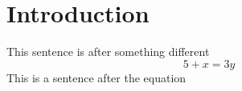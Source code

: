 
\lhead[\chaptername~\thechapter]{\rightmark}


\rhead[\leftmark]{}


\lfoot[\thepage]{}


\cfoot{}


\rfoot[]{\thepage}


\chapter{Introduction}
\label{cha:intro}
\lipsum[2]
This sentence is after something different\\

\begin{equation*}
5+x=3y
\end{equation*}
This is a sentence after the equation

